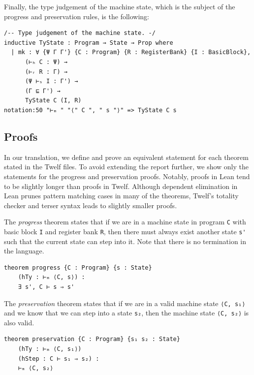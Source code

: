 \documentclass[]{NobArticle}
\begin{document}
Finally, the type judgement of the machine state, which is the subject of the progress and preservation rules, is the following:

\begin{minipage}{\linewidth}
\begin{lstlisting}
/-- Type judgement of the machine state. -/
inductive TyState : Program → State → Prop where
  | mk : ∀ {Ψ Γ Γ'} {C : Program} {R : RegisterBank} {I : BasicBlock},
      (⊢ₕ C : Ψ) →
      (⊢ᵣ R : Γ) →
      (Ψ ⊢ₛ I : Γ') →
      (Γ ⊑ Γ') →
      TyState C (I, R)
notation:50 "⊢ₘ " "⟨" C ", " s "⟩" => TyState C s
\end{lstlisting}
\end{minipage}

\subsection{Proofs}

In our translation, we define and prove an equivalent statement for each theorem stated in the Twelf files. To avoid extending the report further, we show only the statements for the progress and preservation proofs. Notably, proofs in Lean tend to be slightly longer than proofs in Twelf. Although dependent elimination in Lean prunes pattern matching cases in many of the theorems, Twelf's totality checker and terser syntax leads to slightly smaller proofs.

The \textit{progress} theorem states that if we are in a machine state in program \lstinline|C| with basic block \lstinline|I| and register bank \lstinline|R|, then there must always exist another state \lstinline|s'| such that the current state can step into it. Note that there is no termination in the language.

\begin{minipage}{\linewidth}
\begin{lstlisting}
theorem progress {C : Program} {s : State}
    (hTy : ⊢ₘ ⟨C, s⟩) :
    ∃ s', C ⊢ s ⇒ s'
\end{lstlisting}
\end{minipage}

The \textit{preservation} theorem states that if we are in a valid machine state \lstinline|⟨C, s₁⟩| and we know that we can step into a state \lstinline|s₂|, then the machine state \lstinline|⟨C, s₂⟩| is also valid.

\begin{minipage}{\linewidth}
\begin{lstlisting}
theorem preservation {C : Program} {s₁ s₂ : State}
    (hTy : ⊢ₘ ⟨C, s₁⟩)
    (hStep : C ⊢ s₁ ⇒ s₂) :
    ⊢ₘ ⟨C, s₂⟩
\end{lstlisting}
\end{minipage}
\end{document}
